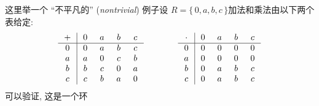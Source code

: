 \begin{example}
    这里举一个 ``不平凡的'' (\textit{nontrivial}) 例子\period 设 $R = \{\, 0,a,b,c \,\}$\period 加法和乘法由以下两个表给定:
    \begin{align*}
        \arraycolsep=0.25cm
        \begin{array}{c|cccc}
            + & 0 & a & b & c \\ \hline
            0 & 0 & a & b & c \\
            a & a & 0 & c & b \\
            b & b & c & 0 & a \\
            c & c & b & a & 0 \\
        \end{array}
        \qquad \qquad
        \begin{array}{c|cccc}
            \cdot & 0 & a & b & c \\ \hline
            0     & 0 & 0 & 0 & 0 \\
            a     & 0 & 0 & 0 & 0 \\
            b     & 0 & a & b & c \\
            c     & 0 & a & b & c \\
        \end{array}
    \end{align*}
    可以验证, 这是一个环\period
\end{example}

